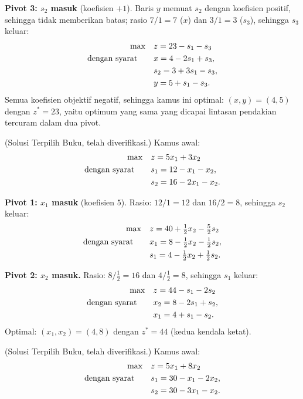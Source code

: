 \textbf{Pivot 3: $s_2$ masuk} (koefisien $+1$). Baris $y$ memuat $s_2$
dengan koefisien positif, sehingga tidak memberikan batas; rasio $7/1 = 7$
($x$) dan $3/1 = 3$ ($s_3$), sehingga $s_3$ keluar:
\[
\begin{aligned}
\max\quad & z = 23 - s_1 - s_3 \\
\mbox{dengan syarat}\quad\quad & x = 4 - 2s_1 + s_3, \\
& s_2 = 3 + 3s_1 - s_3, \\
& y = 5 + s_1 - s_3.
\end{aligned}
\]
Semua koefisien objektif negatif, sehingga kamus ini optimal:
$(x, y) = (4, 5)$ dengan $z^* = 23$, yaitu optimum yang sama yang dicapai lintasan
pendakian tercuram dalam dua pivot.


(Solusi Terpilih Buku, telah diverifikasi.) Kamus awal:
\[
\begin{aligned}
\max\quad & z = 5x_1 + 3x_2 \\
\mbox{dengan syarat}\quad\quad & s_1 = 12 - x_1 - x_2, \\
& s_2 = 16 - 2x_1 - x_2.
\end{aligned}
\]

\textbf{Pivot 1: $x_1$ masuk} (koefisien $5$). Rasio: $12/1 = 12$ dan
$16/2 = 8$, sehingga $s_2$ keluar:
\[
\begin{aligned}
\max\quad & z = 40 + \tfrac12 x_2 - \tfrac52 s_2 \\
\mbox{dengan syarat}\quad\quad & x_1 = 8 - \tfrac12 x_2 - \tfrac12 s_2, \\
& s_1 = 4 - \tfrac12 x_2 + \tfrac12 s_2.
\end{aligned}
\]

\textbf{Pivot 2: $x_2$ masuk.} Rasio: $8/\tfrac12 = 16$ dan
$4/\tfrac12 = 8$, sehingga $s_1$ keluar:
\[
\begin{aligned}
\max\quad & z = 44 - s_1 - 2s_2 \\
\mbox{dengan syarat}\quad\quad & x_2 = 8 - 2s_1 + s_2, \\
& x_1 = 4 + s_1 - s_2.
\end{aligned}
\]
Optimal: $(x_1, x_2) = (4, 8)$ dengan $z^* = 44$ (kedua kendala ketat).


(Solusi Terpilih Buku, telah diverifikasi.) Kamus awal:
\[
\begin{aligned}
\max\quad & z = 5x_1 + 8x_2 \\
\mbox{dengan syarat}\quad\quad & s_1 = 30 - x_1 - 2x_2, \\
& s_2 = 30 - 3x_1 - x_2.
\end{aligned}
\]

